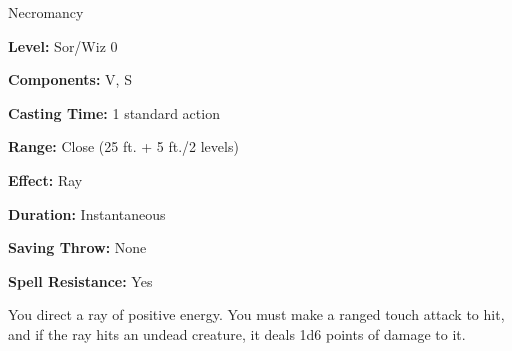 
Necromancy

\textbf{Level:} Sor/Wiz 0

\textbf{Components:} V, S

\textbf{Casting Time:} 1 standard action

\textbf{Range:} Close (25 ft. + 5 ft./2 levels)

\textbf{Effect:} Ray

\textbf{Duration:} Instantaneous

\textbf{Saving Throw:} None

\textbf{Spell Resistance:} Yes

You direct a ray of positive energy. You must make a ranged touch attack to hit, 
and if the ray hits an undead creature, it deals 1d6 points of damage to it.

